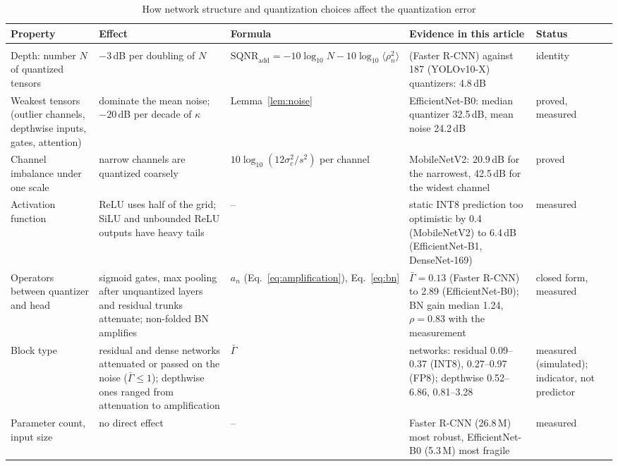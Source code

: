 \documentclass[pdflatex,sn-mathphys-num]{sn-jnl}%
\theoremstyle{thmstyleone}%
\theoremstyle{thmstyletwo}%
\theoremstyle{thmstylethree}%
\begin{document}
\begin{appendices}
\begin{table}[htbp]
\footnotesize\setlength{\tabcolsep}{3pt}\renewcommand{\arraystretch}{0.94}
\caption{How network structure and quantization choices affect the quantization error}\label{tab:factors}
\begin{tabular}{@{}>{\raggedright\arraybackslash}p{2.1cm}>{\raggedright\arraybackslash}p{3.1cm}>{\raggedright\arraybackslash}p{2.2cm}>{\raggedright\arraybackslash}p{3.4cm}>{\raggedright\arraybackslash}p{1.4cm}@{}}
\toprule
Property & Effect & Formula & Evidence in this article & Status \\
\midrule
\multicolumn{5}{@{}l}{\emph{Network structure}} \\
Depth: number $N$ of quantized tensors & $-3$\,dB per doubling of $N$ & $\mathrm{SQNR}_\text{add}=-10\log_{10}N-10\log_{10}\langle\rho_n^2\rangle$ & 62 (Faster R-CNN) against 187 (YOLOv10-X) quantizers: 4.8\,dB & identity \\
Weakest tensors (outlier channels, depthwise inputs, gates, attention) & dominate the mean noise; $-20$\,dB per decade of $\kappa$ & Lemma~\ref{lem:noise} & EfficientNet-B0: median quantizer 32.5\,dB, mean noise 24.2\,dB & proved, measured \\
Channel imbalance under one scale & narrow channels are quantized coarsely & $10\log_{10}(12\sigma_c^2/s^2)$ per channel & MobileNetV2: 20.9\,dB for the narrowest, 42.5\,dB for the widest channel & proved \\
Activation function & ReLU uses half of the grid; SiLU and unbounded ReLU outputs have heavy tails & -- & static INT8 prediction too optimistic by 0.4 (MobileNetV2) to 6.4\,dB (EfficientNet-B1, DenseNet-169) & measured \\
Operators between quantizer and head & sigmoid gates, max pooling after unquantized layers and residual trunks attenuate; non-folded BN amplifies & $a_n$ (Eq.~\eqref{eq:amplification}), Eq.~\eqref{eq:bn} & $\bar\Gamma=0.13$ (Faster R-CNN) to 2.89 (EfficientNet-B0); BN gain median 1.24, $\rho=0.83$ with the measurement & closed form, measured \\
Block type & residual and dense networks attenuated or passed on the noise ($\bar\Gamma\le1$); depthwise ones ranged from attenuation to amplification & $\bar\Gamma$ & 15 networks: residual 0.09--0.37 (INT8), 0.27--0.97 (FP8); depthwise 0.52--6.86, 0.81--3.28 & measured (simulated); indicator, not predictor \\
Parameter count, input size & no direct effect & -- & Faster R-CNN (26.8\,M) most robust, EfficientNet-B0 (5.3\,M) most fragile & measured \\

\end{tabular}
\end{table}
\end{appendices}
\end{document}
